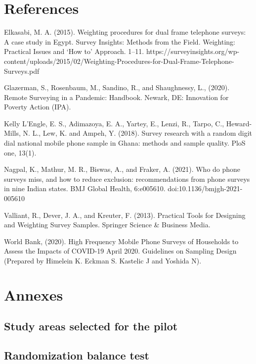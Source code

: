 \documentclass[11pt,harvard]{article}
\begin{document}
	
	\pagebreak
	
	
	\section{References}
	
	Elkasabi, M. A. (2015). Weighting procedures for dual frame telephone surveys: A case study in Egypt. Survey Insights: Methods from the Field. Weighting: Practical Issues and ‘How to’ Approach. 1–11. https://surveyinsights.org/wp-content/uploads/2015/02/Weighting-Procedures-for-Dual-Frame-Telephone-Surveys.pdf
	
	Glazerman, S., Rosenbaum, M., Sandino, R., and Shaughnessy, L., (2020). Remote Surveying in a Pandemic: Handbook. Newark, DE: Innovation for Poverty Action (IPA).
	
	Kelly L’Engle, E. S., Adimazoya, E. A., Yartey, E., Lenzi, R., Tarpo, C., Heward-Mills, N. L., Lew, K. and Ampeh, Y. (2018). Survey research with a random digit dial national mobile phone sample in Ghana: methods and sample quality. PloS one, 13(1).
	
	Nagpal, K., Mathur, M. R., Biswas, A., and Fraker, A. (2021). Who do phone surveys miss, and how to reduce exclusion: recommendations from phone surveys in nine Indian states. BMJ Global Health, 6:e005610. doi:10.1136/bmjgh-2021-005610
	
	Valliant, R., Dever, J. A., and Kreuter, F. (2013). Practical Tools for Designing and Weighting Survey Samples. Springer Science \& Business Media.
	
	World Bank, (2020). High Frequency Mobile Phone Surveys of Households to Assess the Impacts of COVID-19 April 2020. Guidelines on Sampling Design (Prepared by Himelein K. Eckman S. Kastelic J and Yoshida N).
	
	\pagebreak
	
	
	\section{Annexes}
	\subsection{Study areas selected for the pilot}
	
	\label{tab:ADMIN5_BF}
	
	\subsection{Randomization balance test}
	
\end{document}
